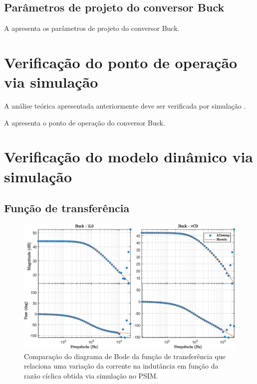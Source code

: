 \subsection{Parâmetros de projeto do conversor Buck}


A  apresenta os parâmetros de projeto do conversor Buck.






\section{Verificação do ponto de operação via simulação}

A análise teórica apresentada anteriormente deve ser verificada por simulação \cite{noauthor_psim_nodate}.

A  apresenta o ponto de operação do conversor Buck.




\section{Verificação do modelo dinâmico via simulação}

\subsection{Função de transferência}


\begin{figure}[!ht]
	\centering
	\includegraphics[width=1\linewidth]{Figs/Buck-ValidacaoModelo}
	\caption{Comparação do diagrama de Bode da função de transferência que relaciona uma variação da corrente na indutância em função da razão cíclica obtida via simulação no PSIM.}
	\label{fig:buck-il0}
\end{figure}


